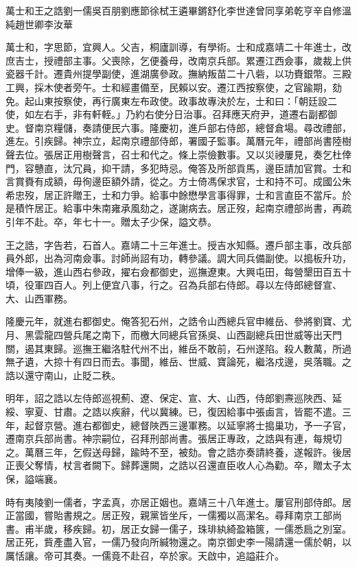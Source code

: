 
\begin{pinyinscope}
萬士和王之誥劉一儒吳百朋劉應節徐栻王遴畢鏘舒化李世達曾同享弟乾亨辛自修溫純趙世卿李汝華

萬士和，字思節，宜興人。父吉，桐廬訓導，有學術。士和成嘉靖二十年進士，改庶吉士，授禮部主事。父喪除，乞便養母，改南京兵部。累遷江西僉事，歲裁上供瓷器千計。遷貴州提學副使，進湖廣參政。撫納叛苗二十八砦，以功賚銀幣。三殿工興，採木使者旁午。士和經畫備至，民賴以安。遷江西按察使，之官踰期，劾免。起山東按察使，再行廣東左布政使。政事故專決於左，士和曰：「朝廷設二使，如左右手，非有軒輊。」乃約右使分日治事。召拜應天府尹，道遷右副都御史。督南京糧儲，奏請便民六事。隆慶初，進戶部右侍郎，總督倉場。尋改禮部，進左。引疾歸。神宗立，起南京禮部侍郎，署國子監事。萬曆元年，禮部尚書陸樹聲去位。張居正用樹聲言，召士和代之。條上崇儉數事。又以災祲屢見，奏乞杜倖門，容戇直，汰冗員，抑干請，多犯時忌。俺答及所部貢馬，邊臣請加官賞。士和言賞賚有成額，毋徇邊臣額外請，從之。方士倚馮保求官，士和持不可。成國公朱希忠歿，居正許贈王，士和力爭。給事中餘懋學言事得罪，士和言直臣不當斥。於是積忤居正。給事中朱南雍承風劾之，遂謝病去。居正歿，起南京禮部尚書，再疏引年不赴。卒，年七十一。贈太子少保，謚文恭。

王之誥，字告若，石首人。嘉靖二十三年進士。授吉水知縣。遷戶部主事，改兵部員外郎，出為河南僉事。討師尚詔有功，轉參議。調大同兵備副使。以搗板升功，增俸一級，進山西右參政，擢右僉都御史，巡撫遼東。大興屯田，每營墾田百五十頃，役軍四百人。列上便宜八事，行之。召為兵部右侍郎。尋以左侍郎總督宣、大、山西軍務。

隆慶元年，就進右都御史。俺答犯石州，之誥令山西總兵官申維岳、參將劉寶、尤月、黑雲龍四營兵尾之南下，而檄大同總兵官孫吳、山西副總兵田世威等出天門關，遏其東歸。巡撫王繼洛駐代州不出，維岳不敢前，石州遂陷。殺人數萬，所過無孑遺，大掠十有四日而去。事聞，維岳、世威、寶論死，繼洛戍邊，吳落職。之誥以還守南山，止貶二秩。

明年，詔之誥以左侍郎巡視薊、遼、保定、宣、大、山西，侍郎劉燾巡陜西、延綏、寧夏、甘肅。之誥以疾辭，代以冀練。已，復因給事中張鹵言，皆罷不遣。三年，起督京營。進右都御史，總督陜西三邊軍務。以延寧將士搗巢功，予一子官，遷南京兵部尚書。神宗嗣位，召拜刑部尚書。張居正專政，之誥與有連，每規切之。萬曆三年，乞假送母歸，踰時不至，被劾。會之誥亦奏請終養，遂報許。後居正喪父奪情，杖言者闕下。歸葬還闕，之誥以召還直臣收人心為勸。卒，贈太子太保，謚端襄。

時有夷陵劉一儒者，字孟真，亦居正姻也。嘉靖三十八年進士。屢官刑部侍郎。居正當國，嘗貽書規之。居正歿，親黨皆坐斥，一儒獨以高潔名。尋拜南京工部尚書。甫半歲，移疾歸。初，居正女歸一儒子，珠琲紈綺盈箱篋，一儒悉扃之別室。居正死，貲產盡入官，一儒乃發向所緘物還之。南京御史李一陽請還一儒於朝，以厲恬讓。帝可其奏。一儒竟不赴召，卒於家。天啟中，追謚莊介。


\end{pinyinscope}
